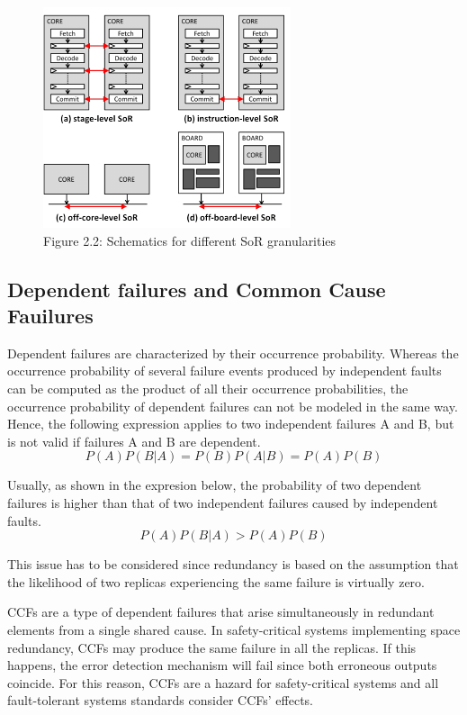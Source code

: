 \begin{figure}[h]
    \centering
    \includegraphics[scale=1.25]{img/differentSoR.png}
    \caption{Figure 2.2: Schematics for different SoR granularities \cite{hernandez2014live}}
    \label{fig:SoR}
\end{figure}
\bigskip





\subsection{Dependent failures and Common Cause Fauilures}
\label{section:CCFs}

Dependent failures \cite{Tummeltshammer2009} are characterized by their occurrence probability. Whereas the occurrence probability of several failure events produced by independent faults can be computed as the product of all their occurrence probabilities, the occurrence probability of dependent failures can not be modeled in the same way. Hence, the following expression applies to two independent failures A and B, but is not valid if failures A and B are dependent. \[P(A) P(B|A) = P(B) P(A|B) = P(A) P(B)\]

Usually, as shown in the expresion below, the probability of two dependent failures is higher than that of two independent failures caused by independent faults. \[P(A) P(B|A) > P(A) P(B)\]

This issue has to be considered since redundancy is based on the assumption that the likelihood of two replicas experiencing the same failure is virtually zero.

CCFs are a type of dependent failures that arise simultaneously in redundant elements from a single shared cause. In safety-critical systems implementing space redundancy, CCFs may produce the same failure in all the replicas. If this happens, the error detection mechanism will fail since both erroneous outputs coincide. For this reason, CCFs are a hazard for safety-critical systems and all fault-tolerant systems standards consider CCFs' effects.

